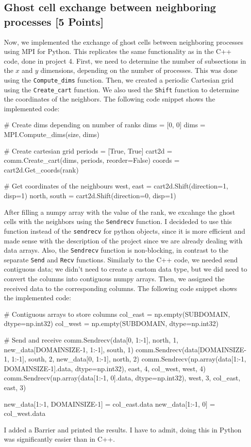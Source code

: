 \documentclass[unicode,11pt,a4paper,oneside,numbers=endperiod,openany]{scrartcl}
\begin{document}
\subsection{Ghost cell exchange between neighboring processes [5 Points]}
Now, we implemented the exchange of ghost cells between neighboring processes
using MPI for Python.
This replicates the same functionality as in the C++ code, done in project 4.
First, we need to determine the number of subsections in the $x$ and $y$
dimensions, depending on the number of processes. This was done using the
\texttt{Compute\_dims} function. Then, we created a periodic Cartesian grid using the
\texttt{Create\_cart} function. We also used the \texttt{Shift} function to
determine the coordinates of the neighbors. The following code snippet shows
the implemented code:
\begin{pythonverbatim}
# Create dims depending on number of ranks
dims = [0, 0]
dims = MPI.Compute_dims(size, dims)

# Create cartesian grid
periods = [True, True]
cart2d = comm.Create_cart(dims, periods, reorder=False)
coords = cart2d.Get_coords(rank)

# Get coordinates of the neighbours
west, east = cart2d.Shift(direction=1, disp=1)
north, south = cart2d.Shift(direction=0, disp=1)
\end{pythonverbatim}
After filling a numpy array with the value of the rank, we excahnge the ghost
cells with the neighbors using the \texttt{Sendrecv} function. 
I decideded to use this function instead of the \texttt{sendrecv} for python
objects, since it is more efficient and made sense with the description of the
project since we are already dealing with data arrays.
Also, the \texttt{Sendrecv} function is non-blocking, in contrast to the
separate \texttt{Send} and \texttt{Recv} functions.
Similarly to the C++ code, we needed send contiguous data; we didn't need to
create a custom data type, but we did need to convert the columns into
contiguous numpy arrays. Then, we assigned the received data to the
corresponding columns.
The following code snippet shows the implemented code:
\begin{pythonverbatim}
# Contiguous arrays to store columns
col_east = np.empty(SUBDOMAIN, dtype=np.int32)
col_west = np.empty(SUBDOMAIN, dtype=np.int32)

# Send and receive
comm.Sendrecv(data[0, 1:-1], north, 1, new_data[DOMAINSIZE-1, 1:-1], south, 1)
comm.Sendrecv(data[DOMAINSIZE-1, 1:-1], south, 2, new_data[0, 1:-1], north, 2)
comm.Sendrecv(np.array(data[1:-1, DOMAINSIZE-1].data,
              dtype=np.int32), east, 4, col_west, west, 4)
comm.Sendrecv(np.array(data[1:-1, 0].data,
              dtype=np.int32), west, 3, col_east, east, 3)

new_data[1:-1, DOMAINSIZE-1] = col_east.data
new_data[1:-1, 0] = col_west.data
\end{pythonverbatim}
I added a Barrier and printed the results. I have to admit, doing this in Python was significantly easier than in C++.
\end{document}
